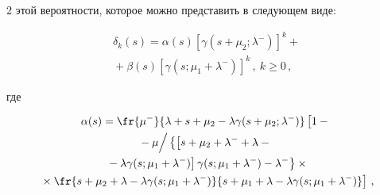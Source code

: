 \begin{multicols}{2}
этой вероятности, которое можно представить в следующем виде:


\begin{multline*}


\delta_k(s) = \alpha (s) \left[\gamma(s+\mu_2;\lambda^-)\right]^k


+ {}\\


{}+\beta (s) \left[\gamma(s;\mu_1 + \lambda^-)\right]^k\,, \ k \ge 0\,,


\end{multline*}


где


\begin{multline*}


\alpha (s) = \fr{\mu^- }{\lambda + s+\mu_2 - \lambda \gamma(s+\mu_2;\lambda^-)}


\left [ \vphantom{\fr{s + \mu_2 + \lambda - \lambda \gamma(s; \mu_1+ \lambda^-) }


{s + \mu_1 + \lambda  - \lambda\gamma(s; \mu_1 +\lambda^-)}}


 1 -{}\right.\\


{}- { \mu}\Big / 


\left\{\left[ 


s+\mu_2 + \lambda^- + \lambda


- {}\right.\right.\\


\left.\left.{}-\lambda \gamma(s; \mu_1 + \lambda^-) \right] \gamma(s; \mu_1 + \lambda^-) - \lambda^- \right\}


\times{}


\\


\left.{}\times


\fr{s + \mu_2 + \lambda - \lambda \gamma(s; \mu_1+ \lambda^-) }


{s + \mu_1 + \lambda  - \lambda\gamma(s; \mu_1 +\lambda^-)}


\right ]\,,


\end{multline*}





\vspace*{-12pt}





\noindent


\begin{multline*}



\end{multline*}
\end{multicols}
